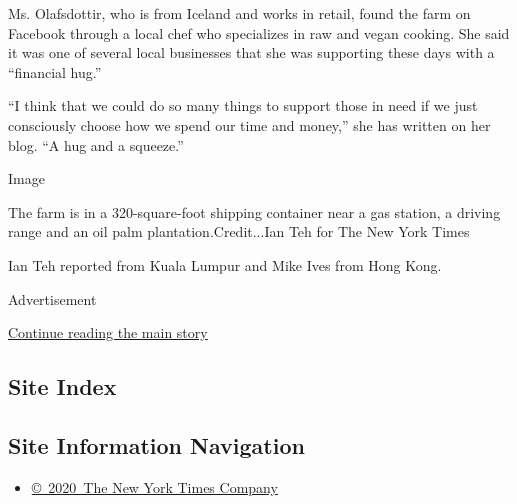 Ms. Olafsdottir, who is from Iceland and works in retail, found the farm
on Facebook through a local chef who specializes in raw and vegan
cooking. She said it was one of several local businesses that she was
supporting these days with a ``financial hug.''

``I think that we could do so many things to support those in need if we
just consciously choose how we spend our time and money,'' she has
written on her blog. ``A hug and a squeeze.''

Image

The farm is in a 320-square-foot shipping container near a gas station,
a driving range and an oil palm plantation.Credit...Ian Teh for The New
York Times

Ian Teh reported from Kuala Lumpur and Mike Ives from Hong Kong.

Advertisement

\protect\hyperlink{after-bottom}{Continue reading the main story}

\hypertarget{site-index}{%
\subsection{Site Index}\label{site-index}}

\hypertarget{site-information-navigation}{%
\subsection{Site Information
Navigation}\label{site-information-navigation}}

\begin{itemize}
\tightlist
\item
  \href{https://help.nytimes3xbfgragh.onion/hc/en-us/articles/115014792127-Copyright-notice}{©~2020~The
  New York Times Company}
\end{itemize}

